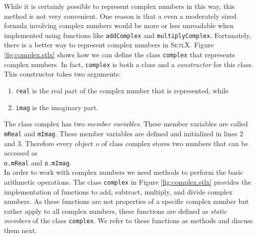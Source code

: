 While it is certainly possible to represent complex numbers in this way, this method is not very convenient.
One reason is that a even a moderately sized formula involving complex numbers would be more or less unreadable 
when implemented using functions like \texttt{addComplex} and \texttt{multiplyComplex}.  Fortunately, there is 
a better way to represent complex numbers in \textsc{SetlX}.  Figure \ref{fig:complex.stlx} shows how we can define
the class \texttt{complex} that represents complex numbers.  In fact, \texttt{complex} is both a class and a 
\emph{constructor} for this class.  This constructor takes two arguments:
\begin{enumerate}
\item \texttt{real} is the real part of the complex number that is represented, while
\item \texttt{imag} is the imaginary part.
\end{enumerate}
The class complex has two \emph{member variables}.  These member variables are called \texttt{mReal} and \texttt{mImag}.
These member variables are defined and initialized in lines 2 and 3.  Therefore every object $o$ of class complex stores two 
numbers that can be accessed as
\\[0.2cm]
\hspace*{1.3cm}
\texttt{o.mReal} \quad and \quad \texttt{o.mImag}.
\\[0.2cm]
In order to work with complex numbers we need methods to perform the basic arithmetic operations.
The class \texttt{complex} in Figure \ref{fig:complex.stlx} provides the implementation of functions
to add, subtract, multiply, and divide complex numbers.  As these functions are not properties of a
specific complex number but rather apply to all complex numbers, these functions are defined as
\emph{static members} of the class \texttt{complex}.  We refer to these functions as methods and discuss 
them next.
